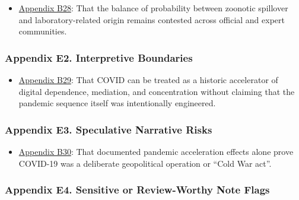 \documentclass[
  american,
  11pt,
  letterpaper,
]{article}
\providecommand{\tightlist}{%
  \setlength{\itemsep}{0pt}\setlength{\parskip}{0pt}}
\begin{document}
\begin{itemize}
\tightlist
\item
  \hyperref[appendix-b28-the-balance-of-probability-between-zoonotic-spillover-and-laboratory-related-orig]{Appendix
  B28}: That the balance of probability between zoonotic spillover and
  laboratory-related origin remains contested across official and expert
  communities.
\end{itemize}

\subsubsection{Appendix E2. Interpretive
Boundaries}\label{appendix-e2-interpretive-boundaries}

\begin{itemize}
\tightlist
\item
  \hyperref[appendix-b29-covid-can-be-treated-as-a-historic-accelerator-of-digital-dependence-mediation]{Appendix
  B29}: That COVID can be treated as a historic accelerator of digital
  dependence, mediation, and concentration without claiming that the
  pandemic sequence itself was intentionally engineered.
\end{itemize}

\subsubsection{Appendix E3. Speculative Narrative
Risks}\label{appendix-e3-speculative-narrative-risks}

\begin{itemize}
\tightlist
\item
  \hyperref[appendix-b30-documented-pandemic-acceleration-effects-alone-prove-covid-19-was-a-deliberate-ge]{Appendix
  B30}: That documented pandemic acceleration effects alone prove
  COVID-19 was a deliberate geopolitical operation or ``Cold War act''.
\end{itemize}

\subsubsection{Appendix E4. Sensitive or Review-Worthy Note
Flags}\label{appendix-e4-sensitive-or-review-worthy-note-flags}
\end{document}

